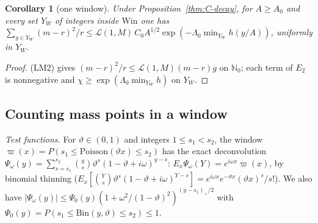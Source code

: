 \documentclass[10pt,letterpaper]{article}
\newtheorem{corollary}[theorem]{Corollary}
\begin{document}
\begin{corollary}[one window]\label{cor:C-window}
Under Proposition~\ref{thm:C-decay}, for $A\ge A_0$ and every set $Y_W$ of integers inside $\mathrm{Win}$ one has $\sum_{y\in Y_W}(m-r)^2/r\le\mathcal L(1,M)\,C_0A^{1/2}\exp(-\Lambda_0\min_{Y_W}h(y/A))$, uniformly in $Y_W$.
\end{corollary}
\begin{proof}
(LM2) gives $(m-r)^2/r\le\mathcal L(1,M)(m-r)g$ on $\mathbb N_0$; each term of $E_2$ is nonnegative and
$\chi\ge\exp(\Lambda_0\min_{Y_W}h)$ on $Y_W$.
\end{proof}

\subsection{Counting mass points in a window}

\emph{Test functions.} For $\vartheta\in(0,1)$ and integers $1\le s_1<s_2$, the window
$\varpi(x)=P(s_1\le\mathrm{Poisson}(\vartheta x)\le s_2)$ has the exact deconvolution
$\Psi_\omega(y)=\sum_{s=s_1}^{s_2}\binom ys\vartheta^s(1-\vartheta+i\omega)^{y-s}$: $E_x\Psi_\omega(Y)=e^{i\omega x}\varpi(x)$, by binomial
thinning ($E_x[\binom Ys\vartheta^s(1-\vartheta+i\omega)^{Y-s}]=e^{i\omega x}e^{-\vartheta x}(\vartheta x)^s/s!$). We also have
$|\Psi_\omega(y)|\le\Psi_0(y)(1+\omega^2/(1-\vartheta)^2)^{(y-s_1)_+/2}$ with $\Psi_0(y)=P(s_1\le\mathrm{Bin}(y,\vartheta)\le s_2)\le1$.
\end{document}
